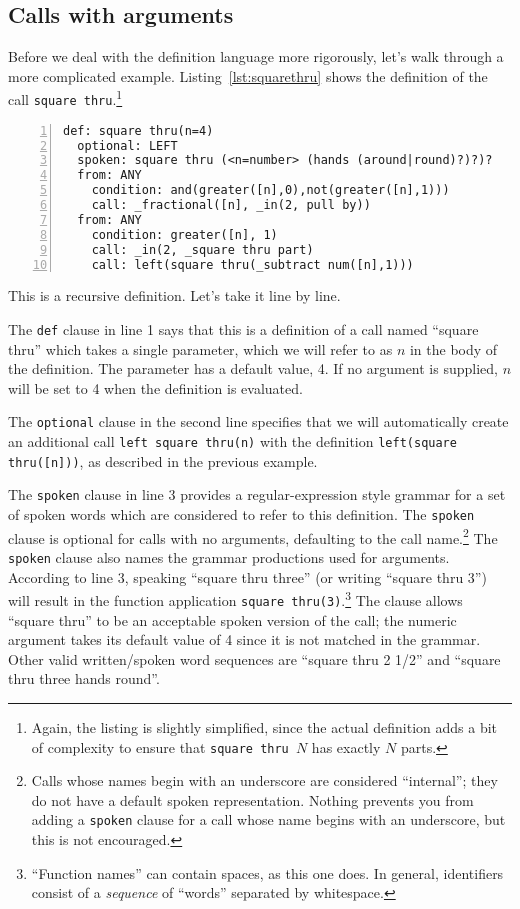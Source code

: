 \documentclass[12pt]{article}
\newcommand{\clause}[1]{\texttt{#1}}
\renewcommand{\call}[1]{\texttt{#1}} %
\begin{document}
\subsection{Calls with arguments}

Before we deal with the definition language more rigorously, let's walk through
a more complicated example.  Listing~\ref{lst:squarethru} shows
the definition of the call \call{square thru}.\footnote{Again, the listing is
  slightly simplified, since the actual definition adds a bit of
  complexity to ensure that \call{square thru $N$} has exactly
  $N$ parts.}

\begin{lstlisting}[numbers=left,float,caption=A definition with arguments.,label=lst:squarethru]
def: square thru(n=4)
  optional: LEFT
  spoken: square thru (<n=number> (hands (around|round)?)?)?
  from: ANY
    condition: and(greater([n],0),not(greater([n],1)))
    call: _fractional([n], _in(2, pull by))
  from: ANY
    condition: greater([n], 1)
    call: _in(2, _square thru part)
    call: left(square thru(_subtract num([n],1)))
\end{lstlisting}

This is a recursive definition.  Let's take it line by line.

The \clause{def} clause in line 1 says that this is a definition of a call named
``square thru'' which takes a single parameter, which we will refer to
as $n$ in the body of the definition.  The parameter has a
default value, 4.  If no argument is supplied, $n$ will be set
to 4 when the definition is evaluated.

The \clause{optional} clause in the second line specifies that we will
automatically create an
additional call \call{left square thru(n)} with the definition
\call{left(square thru([n]))}, as described in the previous example.

The \clause{spoken} clause in line 3 provides a regular-expression
style grammar for a set of spoken words which are considered to refer
to this definition.  The \clause{spoken} clause is optional for calls
with no arguments, defaulting to the call name.\footnote{Calls whose
  names begin with an underscore are considered ``internal''; they do
  not have a default spoken representation.  Nothing prevents you from
  adding a \clause{spoken} clause for a call whose name begins with an
  underscore, but this is not encouraged.}  The \clause{spoken} clause
also names the grammar productions used for arguments.  According to
line 3, speaking ``square thru three'' (or writing ``square thru 3'')
will result in the function application \texttt{square
  thru(3)}.\footnote{``Function names'' can contain spaces, as this
  one does.  In general, identifiers consist of a \textit{sequence} of
  ``words'' separated by whitespace.}  The clause allows ``square
thru'' to be an acceptable spoken version of the call; the numeric
argument takes its default value of 4 since it is not matched in the
grammar.  Other valid written/spoken word sequences are ``square thru 2 1/2''
and ``square thru three hands round''.
\end{document}
